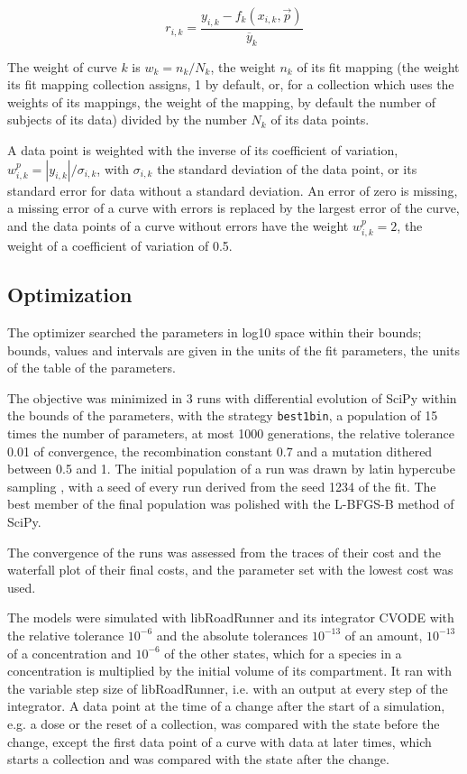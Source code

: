\begin{equation}
r_{i,k} = \frac{y_{i,k} - f_k(x_{i,k}, \vec{p})}{\overline{y}_k}
\end{equation}

The weight of curve $k$ is $w_k = n_k / N_k$, the weight $n_k$ of its fit mapping (the weight its fit mapping collection assigns, 1 by default, or, for a collection which uses the weights of its mappings, the weight of the mapping, by default the number of subjects of its data) divided by the number $N_k$ of its data points.

A data point is weighted with the inverse of its coefficient of variation, $w^{p}_{i,k} = |y_{i,k}| / \sigma_{i,k}$, with $\sigma_{i,k}$ the standard deviation of the data point, or its standard error for data without a standard deviation. An error of zero is missing, a missing error of a curve with errors is replaced by the largest error of the curve, and the data points of a curve without errors have the weight $w^{p}_{i,k} = 2$, the weight of a coefficient of variation of 0.5.

\subsection{Optimization}

The optimizer searched the parameters in log10 space within their bounds; bounds, values and intervals are given in the units of the fit parameters, the units of the table of the parameters.

The objective was minimized in 3 runs with differential evolution \cite{Storn1997} of SciPy \cite{Virtanen2020} within the bounds of the parameters, with the strategy \texttt{best1bin}, a population of 15 times the number of parameters, at most 1000 generations, the relative tolerance 0.01 of convergence, the recombination constant 0.7 and a mutation dithered between 0.5 and 1. The initial population of a run was drawn by latin hypercube sampling \cite{McKay1979}, with a seed of every run derived from the seed 1234 of the fit. The best member of the final population was polished with the L-BFGS-B method of SciPy.

The convergence of the runs was assessed from the traces of their cost and the waterfall plot of their final costs, and the parameter set with the lowest cost was used.

The models were simulated with libRoadRunner \cite{Welsh2023} and its integrator CVODE \cite{Hindmarsh2005} with the relative tolerance $10^{-6}$ and the absolute tolerances $10^{-13}$ of an amount, $10^{-13}$ of a concentration and $10^{-6}$ of the other states, which for a species in a concentration is multiplied by the initial volume of its compartment. It ran with the variable step size of libRoadRunner, i.e. with an output at every step of the integrator. A data point at the time of a change after the start of a simulation, e.g. a dose or the reset of a collection, was compared with the state before the change, except the first data point of a curve with data at later times, which starts a collection and was compared with the state after the change.

